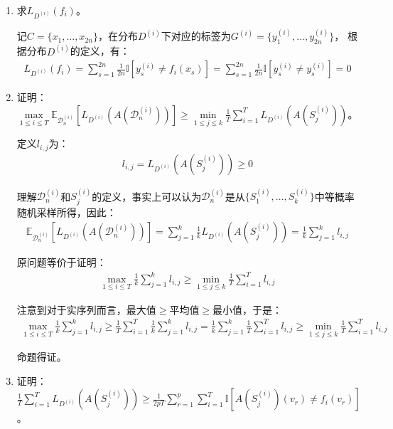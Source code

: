 \documentclass[12pt, a4paper]{article}
\newcommand{\under}[1]{\mathop{#1}\limits_}
\newcommand{\expect}{{\mathbb{E}}}
\newcommand{\unit}{{\mathbb{I}}}
\newcommand{\DD}{{\mathcal{D}}}
\begin{document}
    \begin{enumerate}

    \item 求$L_{D^{(i)}}(f_i)$。

        记$C = \{x_1, ..., x_{2n}\}$，在分布$D^{(i)}$下对应的标签为$G^{(i)} = \{y_1^{(i)}, ..., y_{2n}^{(i)}\}$，
        根据分布$D^{(i)}$的定义，有：
        \begin{align*}
        L_{D^{(i)}}(f_i) = \sum_{s = 1}^{2n} \frac{1}{2 n} \unit[y_s^{(i)} \ne f_i(x_s)] = \sum_{s = 1}^{2n} \frac{1}{2 n} \unit[y_s^{(i)} \ne y_s^{(i)}] = 0
        \end{align*}

    \item 证明：$\under{\max}{1 \le i \le T} \expect_{\DD_n^{(i)}}[L_{D^{(i)}}(A(\DD_n^{(i)}))] \ge \under{\min}{1 \le j \le k} \frac{1}{T} \sum_{i = 1}^{T} L_{D^{(i)}}(A(S_j^{(i)}))$。

        定义$l_{i, j}$为：
        \begin{align*}
        l_{i, j} = L_{D^{(i)}}(A(S_j^{(i)})) \ge 0
        \end{align*}

        理解$\DD_n^{(i)}$和$S_j^{(i)}$的定义，事实上可以认为$\DD_n^{(i)}$是从$\{S_1^{(i)}, ...,S_k^{(i)}\}$中等概率随机采样所得，因此：
        \begin{align*}
        \expect_{\DD_n^{(i)}}[L_{D^{(i)}}(A(\DD_n^{(i)}))] = \sum_{j=1}^{k} \frac{1}{k} L_{D^{(i)}}(A(S_j^{(i)})) = \frac{1}{k} \sum_{j=1}^{k} l_{i, j}
        \end{align*}

        原问题等价于证明：
        \begin{align*}
        \under{\max}{1 \le i \le T} \frac{1}{k} \sum_{j=1}^{k} l_{i, j} \ge \under{\min}{1 \le j \le k} \frac{1}{T} \sum_{i = 1}^{T} l_{i, j}
        \end{align*}

        注意到对于实序列而言，最大值$\ge$平均值$\ge$最小值，于是：
        \begin{align*}
        \under{\max}{1 \le i \le T} \frac{1}{k} \sum_{j=1}^{k} l_{i, j} \ge \frac{1}{T} \sum_{i = 1}^{T} \frac{1}{k} \sum_{j = 1}^{k} l_{i, j} = \frac{1}{k} \sum_{j = 1}^{k} \frac{1}{T} \sum_{i = 1}^{T} l_{i, j} \ge \under{\min}{1 \le j \le k} \frac{1}{T} \sum_{i = 1}^{T} l_{i, j}
        \end{align*}

        命题得证。

    \item 证明：$\frac{1}{T} \sum_{i = 1}^{T} L_{D^{(i)}}(A(S_j^{(i)})) \ge \frac{1}{2 p T} \sum_{r = 1}^{p} \sum_{i = 1}^{T} \unit[A(S_j^{(i)})(v_r) \ne f_i(v_r)]$。


\end{enumerate}
\end{document}
